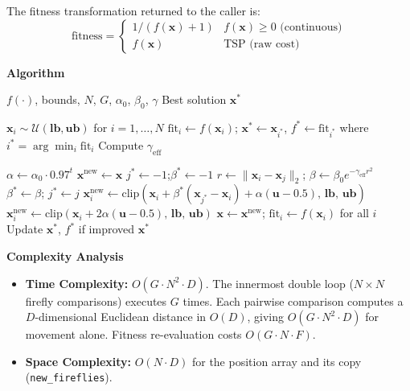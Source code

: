 The fitness transformation returned to the caller is:
\[
\text{fitness} =
\begin{cases}
1/(f(\mathbf{x})+1) & f(\mathbf{x})\ge 0 \text{ (continuous)}\\
f(\mathbf{x})       & \text{TSP (raw cost)}
\end{cases}
\]

\textbf{Algorithm}

\begin{algorithm}[H]
\caption{Firefly Algorithm}
\label{alg:fa}
\begin{algorithmic}[1]
\REQUIRE $f(\cdot)$, bounds, $N$, $G$, $\alpha_0$, $\beta_0$, $\gamma$
\ENSURE Best solution $\mathbf{x}^*$

\STATE $\mathbf{x}_i \sim \mathcal{U}(\mathbf{lb},\mathbf{ub})$ for $i=1,\ldots,N$
\STATE $\text{fit}_i \leftarrow f(\mathbf{x}_i)$;\quad
       $\mathbf{x}^* \leftarrow \mathbf{x}_{i^*}$, $f^*\leftarrow \text{fit}_{i^*}$
       where $i^*=\arg\min_i \text{fit}_i$
\STATE Compute $\gamma_{\text{eff}}$

  \STATE $\alpha \leftarrow \alpha_0\cdot 0.97^{t}$
  \STATE $\mathbf{x}^{\text{new}} \leftarrow \mathbf{x}$  
    \STATE $j^* \leftarrow -1$;\quad $\beta^* \leftarrow -1$
        \STATE $r \leftarrow \|\mathbf{x}_i - \mathbf{x}_j\|_2$;\quad
               $\beta \leftarrow \beta_0 e^{-\gamma_{\text{eff}}r^2}$
        \IF{$\beta > \beta^*$}
          \STATE $\beta^* \leftarrow \beta$;\; $j^* \leftarrow j$
        \ENDIF
      \ENDIF
    \ENDFOR
      \STATE $\mathbf{x}_i^{\text{new}} \leftarrow
             \mathrm{clip}(\mathbf{x}_i + \beta^*(\mathbf{x}_{j^*}-\mathbf{x}_i)
             + \alpha(\mathbf{u}-0.5),\,\mathbf{lb},\,\mathbf{ub})$
    \ELSE
      \STATE $\mathbf{x}_i^{\text{new}} \leftarrow
             \mathrm{clip}(\mathbf{x}_i + 2\alpha(\mathbf{u}-0.5),\,\mathbf{lb},\,\mathbf{ub})$
    \ENDIF
  \ENDFOR
  \STATE $\mathbf{x} \leftarrow \mathbf{x}^{\text{new}}$;\quad
         $\text{fit}_i \leftarrow f(\mathbf{x}_i)$ for all $i$
  \STATE Update $\mathbf{x}^*$, $f^*$ if improved
\ENDFOR
\RETURN $\mathbf{x}^*$
\end{algorithmic}
\end{algorithm}

\textbf{Complexity Analysis}

\begin{itemize}
  \item \textbf{Time Complexity:} $O(G\cdot N^2\cdot D)$. The innermost double loop
        ($N\times N$ firefly comparisons) executes $G$ times. Each pairwise comparison
        computes a $D$-dimensional Euclidean distance in $O(D)$, giving $O(G\cdot N^2\cdot D)$
        for movement alone. Fitness re-evaluation costs $O(G\cdot N\cdot F)$.
  \item \textbf{Space Complexity:} $O(N\cdot D)$ for the position array and its copy
        (\texttt{new\_fireflies}).
\end{itemize}


